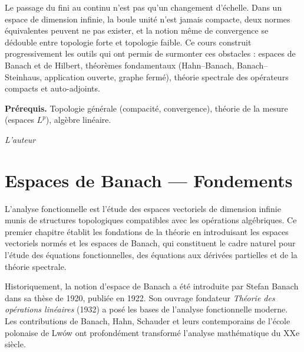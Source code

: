 \documentclass[a4paper,12pt]{book}
\theoremstyle{definition}
\theoremstyle{plain}
\theoremstyle{remark}
\begin{document}
\medskip

Le passage du fini au continu n'est pas qu'un changement d'\'echelle. Dans un espace de dimension infinie, la boule unit\'e n'est jamais compacte, deux normes \'equivalentes peuvent ne pas exister, et la notion m\^eme de convergence se d\'edouble entre topologie forte et topologie faible. Ce cours construit progressivement les outils qui ont permis de surmonter ces obstacles : espaces de Banach et de Hilbert, th\'eor\`emes fondamentaux (Hahn--Banach, Banach--Steinhaus, application ouverte, graphe ferm\'e), th\'eorie spectrale des op\'erateurs compacts et auto-adjoints.

\medskip

\noindent\textbf{Pr\'erequis.} Topologie g\'en\'erale (compacit\'e, convergence), th\'eorie de la mesure (espaces $L^p$), alg\`ebre lin\'eaire.

\vfill
\hfill\textit{L'auteur}



\chapter{Espaces de Banach --- Fondements}
\minitoc
\vspace{1cm}

L'analyse fonctionnelle est l'étude des espaces vectoriels de dimension infinie munis de structures topologiques compatibles avec les opérations algébriques. Ce premier chapitre établit les fondations de la théorie en introduisant les espaces vectoriels normés et les espaces de Banach, qui constituent le cadre naturel pour l'étude des équations fonctionnelles, des équations aux dérivées partielles et de la théorie spectrale.

Historiquement, la notion d'espace de Banach a été introduite par Stefan Banach dans sa thèse de 1920, publiée en 1922. Son ouvrage fondateur \emph{Théorie des opérations linéaires} (1932) a posé les bases de l'analyse fonctionnelle moderne. Les contributions de Banach, Hahn, Schauder et leurs contemporains de l'école polonaise de Lwów ont profondément transformé l'analyse mathématique du XXe siècle.
\end{document}

